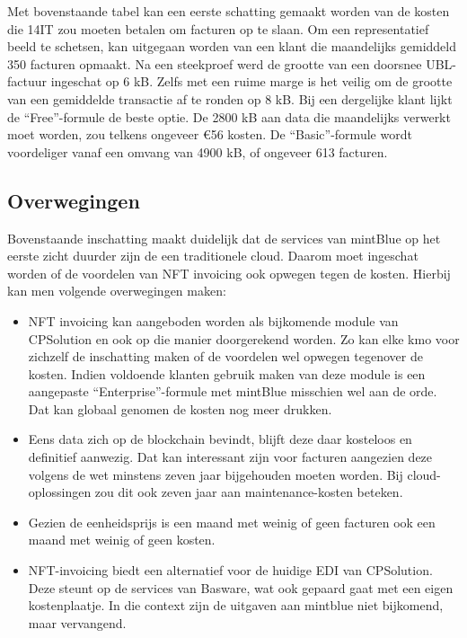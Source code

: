 Met bovenstaande tabel kan een eerste schatting gemaakt worden van de kosten die 14IT zou moeten betalen om facturen op te slaan. Om een representatief beeld te schetsen, kan uitgegaan worden van een klant die maandelijks gemiddeld 350 facturen opmaakt. Na een steekproef werd de grootte van een doorsnee UBL-factuur ingeschat op 6 kB. Zelfs met een ruime marge is het veilig om de grootte van een gemiddelde transactie af te ronden op 8 kB. Bij een dergelijke klant lijkt de ``Free''-formule de beste optie. De 2800 kB aan data die maandelijks verwerkt moet worden, zou telkens ongeveer \euro 56 kosten. De ``Basic''-formule wordt voordeliger vanaf een omvang van 4900 kB, of ongeveer 613 facturen.

\subsection{Overwegingen}
\label{sub:overwegingen}

Bovenstaande inschatting maakt duidelijk dat de services van mintBlue op het eerste zicht duurder zijn de een traditionele cloud. Daarom moet ingeschat worden of de voordelen van NFT invoicing ook opwegen tegen de kosten. Hierbij kan men volgende overwegingen maken:

\begin{itemize}
	\item NFT invoicing kan aangeboden worden als bijkomende module van CPSolution en ook op die manier doorgerekend worden. Zo kan elke kmo voor zichzelf de inschatting maken of de voordelen wel opwegen tegenover de kosten. Indien voldoende klanten gebruik maken van deze module is een aangepaste ``Enterprise''-formule met mintBlue misschien wel aan de orde. Dat kan globaal genomen de kosten nog meer drukken.
	\item Eens data zich op de blockchain bevindt, blijft deze daar kosteloos en definitief aanwezig. Dat kan interessant zijn voor facturen aangezien deze volgens de wet minstens zeven jaar bijgehouden moeten worden. Bij cloud-oplossingen zou dit ook zeven jaar aan maintenance-kosten beteken. 
	\item Gezien de eenheidsprijs is een maand met weinig of geen facturen ook een maand met weinig of geen kosten. 
	\item NFT-invoicing biedt een alternatief voor de huidige EDI van CPSolution. Deze steunt op de services van Basware, wat ook gepaard gaat met een eigen kostenplaatje. In die context zijn de uitgaven aan mintblue niet bijkomend, maar vervangend.
\end{itemize}

